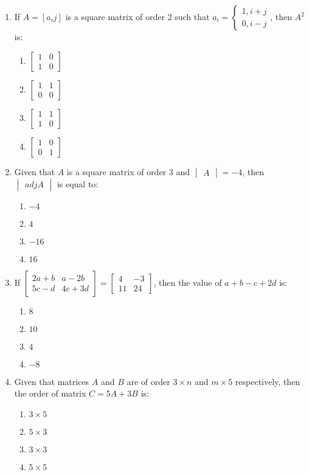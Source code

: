 \documentclass{article}
\providecommand{\mydet}[1]{\ensuremath{\begin{vmatrix}#1\end{vmatrix}}}
\providecommand{\myvec}[1]{\ensuremath{\begin{bmatrix}#1\end{bmatrix}}}
\begin{document}
\begin{enumerate}
    \item If $A = [a_{i}{j}]$ is a square matrix of order $2$ such that $a_{i} = \begin{cases}1, i + j \\0, i-j
    \end{cases}$, then $A^2$ is:
    \begin{enumerate}
        \item $\myvec{1 & 0 \\ 1 & 0}$
        \item $\myvec{1 & 1 \\ 0 & 0}$
        \item $\myvec{1 & 1 \\ 1 & 0}$
        \item $\myvec{1 & 0 \\ 0 & 1}$
    \end{enumerate}

    \item Given that $A$ is a square matrix of order $3$ and $\mydet{A} = -4$, then $\mydet{adj A}$ is equal to:
    \begin{enumerate}
        \item $-4$
        \item $4$
        \item $-16$
        \item $16$
    \end{enumerate}
    
    \item If $\myvec{2a+b & a-2b \\ 5c-d & 4c+3d} = \myvec{4 & -3 \\ 11 & 24}$, then the value of $a + b - c + 2d$ is:
    \begin{enumerate}
        \item $8$
        \item $10$
        \item $4$ 
        \item $-8$
    \end{enumerate}

    \item Given that matrices $A$ and $B$ are of order $3 \times n$ and $m \times 5$ respectively, then the order of matrix $C = 5A + 3B$ is:
    \begin{enumerate}
        \item $ 3 \times 5$ 
        \item $ 5 \times 3$ 
        \item $ 3 \times 3$ 
        \item $ 5 \times 5$
    \end{enumerate}


\end{enumerate}
\end{document}
